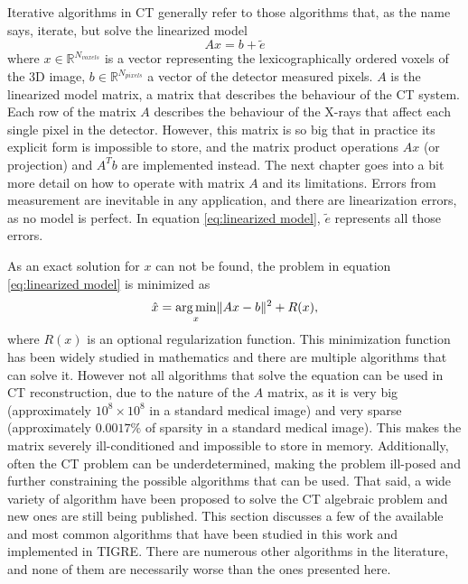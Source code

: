 Iterative algorithms in CT generally refer to those algorithms that, as the name says, iterate, but solve the linearized model 
\begin{equation}
Ax=b+\tilde{e} \label{eq:linearized model}
\end{equation}
 where $x\in \mathbb{R}^{N_{voxels}}$ is a vector representing the lexicographically ordered voxels of the 3D image, $b\in \mathbb{R}^{N_{pixels}} $ a vector of the detector measured pixels. $A$ is the linearized model matrix, a matrix that describes the behaviour of the CT system. Each row of the matrix $A$ describes the behaviour of the X-rays that affect each single pixel in the detector. However, this matrix is so big that in practice its explicit form is impossible to store, and the matrix product operations $Ax$ (or projection) and $A^Tb$ are implemented instead. The next chapter goes into a bit more detail on how to operate with matrix $A$ and its limitations. Errors from measurement are inevitable in any application, and there are linearization errors, as no model is perfect. In equation \ref{eq:linearized model}, $\tilde{e}$ represents all those errors.

As an exact solution for $x$ can not be found, the problem in equation \ref{eq:linearized model} is minimized as
\begin{equation}
\hat{x}=\mathop{\mathrm{arg\,min}}_x \lVert Ax-b\rVert^2+R(x),\label{eq:THE equation}
\end{equation}
 where $R(x)$ is an optional regularization function. This minimization function has been widely studied in mathematics and there are multiple algorithms that can solve it. However not all algorithms that solve the equation can be used in CT reconstruction, due to the nature of the $A$ matrix, as it is very big (approximately $10^8\times 10^8$ in a standard medical image) and very sparse (approximately $0.0017\%$ of sparsity in a standard medical image). This makes the matrix severely ill-conditioned and impossible to store in memory. Additionally, often the CT problem can be underdetermined, making the problem ill-posed and further constraining the possible algorithms that can be used. That said, a wide variety of algorithm have been proposed to solve the CT algebraic problem and new ones are still being published. This section discusses a few of the available and most common algorithms that have been studied in this work and implemented in TIGRE. There are numerous other algorithms in the literature, and none of them are necessarily worse than the ones presented here.


